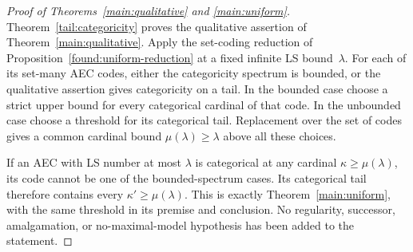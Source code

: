 \begin{proof}[Proof of Theorems~\ref{main:qualitative} and
  \ref{main:uniform}]
Theorem~\ref{tail:categoricity} proves the qualitative
assertion of Theorem~\ref{main:qualitative}.  Apply the
set-coding reduction of
Proposition~\ref{found:uniform-reduction} at a fixed infinite
LS bound~$\lambda$.  For each of its set-many AEC codes,
either the categoricity spectrum is bounded, or the
qualitative assertion gives categoricity on a tail.
In the bounded case choose a strict upper bound for every
categorical cardinal of that code.  In the unbounded case
choose a threshold for its categorical tail.  Replacement
over the set of codes gives a common cardinal bound
$\mu(\lambda)\geq\lambda$ above all these choices.

If an AEC with LS number at most $\lambda$ is categorical
at any cardinal $\kappa\geq\mu(\lambda)$, its code cannot
be one of the bounded-spectrum cases.  Its categorical
tail therefore contains every
$\kappa'\geq\mu(\lambda)$.  This is exactly
Theorem~\ref{main:uniform}, with the same threshold in
its premise and conclusion.  No regularity, successor,
amalgamation, or no-maximal-model hypothesis has been
added to the statement.
\end{proof}
